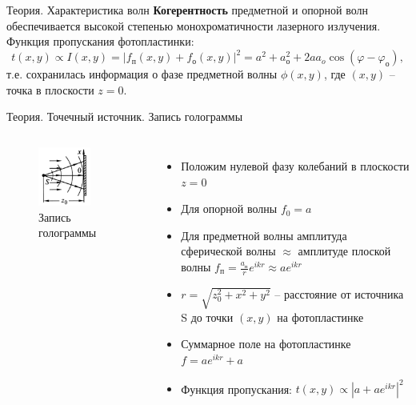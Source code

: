\documentclass[11pt]{beamer} %
\begin{document}
   \begin{frame}{Теория. Характеристика волн}
        \textbf{Когерентность} предметной и опорной волн обеспечивается высокой степенью монохроматичности лазерного излучения.\\
        Функция пропускания фотопластинки:
        \begin{equation}
           t(x,y) \propto I(x,y) = |f_{\text{п}}(x,y) + f_{\text{о}}(x,y)|^2 = a^2+a_о^2+2 a a_o \cos (\varphi - \varphi_о),
        \end{equation}
        т.е. сохранилась информация о фазе предметной волны $\phi(x,y)$, где $(x,y)$ -- точка в плоскости $z=0$.
   \end{frame}

    \begin{frame}{Теория. Точечный источник. Запись голограммы}
    \begin{columns}
            \begin{figure}[H]
                \centering
                \includegraphics[width = 0.7\textwidth]{images/photo_processing.jpg}
                \caption{Запись голограммы}
            \end{figure}
        
            \begin{itemize}
               \item Положим нулевой фазу колебаний в плоскости $z = 0$ 
               \item Для опорной волны $f_0 = a$
               \item Для предметной волны амплитуда сферической волны $\approx$ амплитуде плоской волны $f_\text{п} = \frac{a_\text{п}}{r}e^{ikr} \approx ae^{ikr}$
               \item $r = \sqrt{z_0^2 + x^2 + y^2}$ -- расстояние от источника S до точки $(x,y)$ на фотопластинке
               \item Суммарное поле на фотопластинке $f = ae^{ikr} + a$
               \item Функция пропускания: $t(x, y) \propto \left| a+ a e^{i k r}\right|^2$
           \end{itemize}
        \end{columns}       
   \end{frame}
\end{document}
